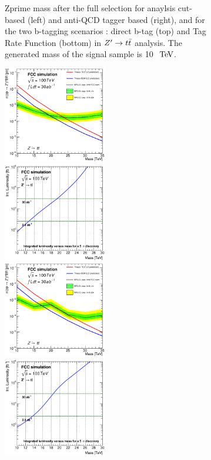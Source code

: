 \documentclass{cernrep}
\begin{document}
\begin{figure}[!htb]
\begin{figure}[!htb]
\caption{Zprime mass after the full selection for anaylsis cut-based (left) and anti-QCD tagger based (right), and for the two b-tagging scenarios : direct b-tag (top) and Tag Rate Function (bottom) in $Z^{\prime} \rightarrow t\bar{t}$ analysis. The generated mass of the signal sample is 10 $\TeV$.}
\label{fig:Zptt_mass_sel_final}
\end{figure}

\begin{figure}[!htb]\centering
\includegraphics[width=0.495\textwidth]{Fig/Zptt/lim_Zprime_tt_fcc_v02_cut.eps}
\includegraphics[width=0.495\textwidth]{Fig/Zptt/DiscoveryPotential_tt_cut_rootStyle.eps}
\includegraphics[width=0.495\textwidth]{Fig/Zptt/lim_Zprime_tt_fcc_v02_cut_TRFbtag.eps}
\includegraphics[width=0.495\textwidth]{Fig/Zptt/DiscoveryPotential_tt_cut_TRFbtag_rootStyle.eps}

\end{figure}
\end{figure}
\end{document}
